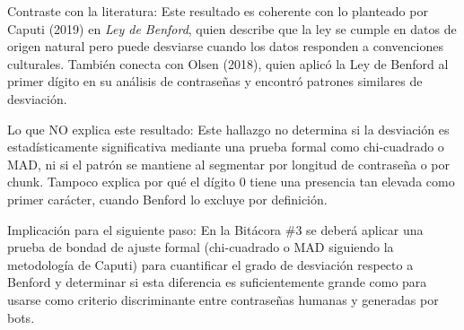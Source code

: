 \documentclass[12pt, letterpaper]{article}
\begin{document}
\noindent
Contraste con la literatura: Este resultado es coherente con lo planteado por Caputi (2019) en \textit{Ley de Benford}, quien describe que la ley se cumple en datos de origen natural pero puede desviarse cuando los datos responden a convenciones culturales. También conecta con Olsen (2018), quien aplicó la Ley de Benford al primer dígito en su análisis de contraseñas y encontró patrones similares de desviación. \newline

\noindent
Lo que NO explica este resultado: Este hallazgo no determina si la desviación es estadísticamente significativa mediante una prueba formal como chi-cuadrado o MAD, ni si el patrón se mantiene al segmentar por longitud de contraseña o por chunk. Tampoco explica por qué el dígito 0 tiene una presencia tan elevada como primer carácter, cuando Benford lo excluye por definición. \newline

\noindent
Implicación para el siguiente paso: En la Bitácora \#3 se deberá aplicar una prueba de bondad de ajuste formal (chi-cuadrado o MAD siguiendo la metodología de Caputi) para cuantificar el grado de desviación respecto a Benford y determinar si esta diferencia es suficientemente grande como para usarse como criterio discriminante entre contraseñas humanas y generadas por bots.
\end{document}
